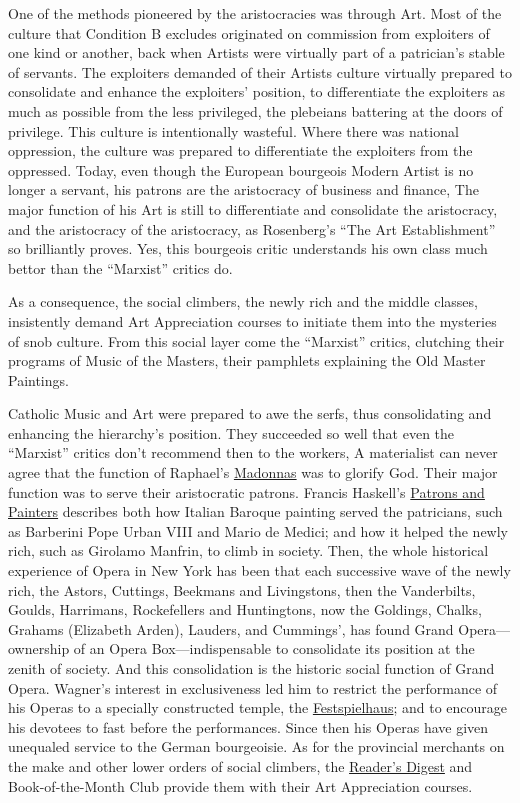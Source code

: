 One of the methods pioneered by the aristocracies was through Art. Most of the culture that Condition B excludes originated on commission from exploiters of one kind or another, back when Artists were virtually part of a patrician's stable of servants. The exploiters demanded of their Artists culture virtually prepared to consolidate and enhance the exploiters' position, to differentiate the exploiters as much as possible from the less privileged, the plebeians battering at the doors of privilege. This culture is intentionally wasteful. Where there was national oppression, the culture was prepared to differentiate the exploiters from the oppressed. Today, even though the European bourgeois Modern Artist is no longer a servant, his patrons are the aristocracy of business and finance, The major function of his Art is still to differentiate and consolidate the aristocracy, and the aristocracy of the aristocracy, as Rosenberg's \enquote{The Art Establishment} so brilliantly proves. Yes, this bourgeois critic understands his own class much bettor than the \enquote{Marxist} critics do.

As a consequence, the social climbers, the newly rich and the middle classes, insistently demand Art Appreciation courses to initiate them into the mysteries of snob culture. From this social layer come the \enquote{Marxist} critics, clutching their programs of Music of the Masters, their pamphlets explaining the Old Master Paintings. 

Catholic Music and Art were prepared to awe the serfs, thus consolidating and enhancing the hierarchy's position. They succeeded so well that even the \enquote{Marxist} critics don't recommend then to the workers, A materialist can never agree that the function of Raphael's \uline{Madonnas} was to glorify God. Their major function was to serve their aristocratic patrons. Francis Haskell's \uline{Patrons and Painters} describes both how Italian Baroque painting served the patricians, such as Barberini Pope Urban VIII and Mario de Medici; and how it helped the newly rich, such as Girolamo Manfrin, to climb in society. Then, the whole historical experience of Opera in New York has been that each successive wave of the newly rich, the Astors, Cuttings, Beekmans and Livingstons, then the Vanderbilts, Goulds, Harrimans, Rockefellers and Huntingtons, now the Goldings, Chalks, Grahams (Elizabeth Arden), Lauders, and Cummings', has found Grand Opera---ownership of an Opera Box---indispensable to consolidate its position at the zenith of society. And this consolidation is the historic social function of Grand Opera. Wagner's interest in exclusiveness led him to restrict the performance of his Operas to a specially constructed temple, the \uline{Festspielhaus}; and to encourage his devotees to fast before the performances. Since then his Operas have given unequaled service to the German bourgeoisie. As for the provincial merchants on the make and other lower orders of social climbers, the \uline{Reader's Digest} and Book-of-the-Month Club provide them with their Art Appreciation courses.

